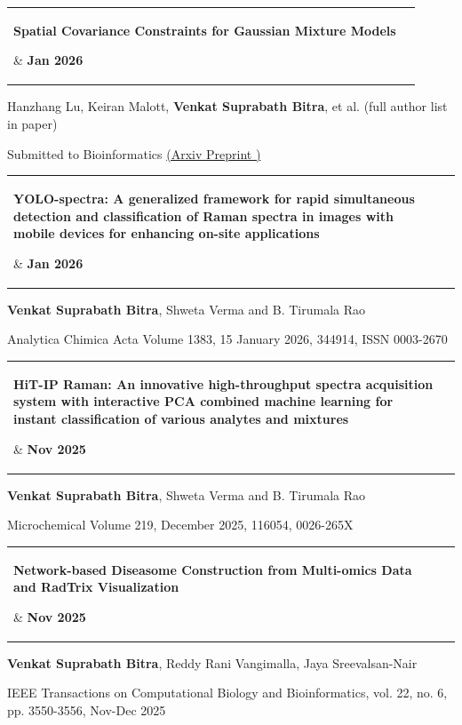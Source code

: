 \documentclass[letterpaper,11pt]{article}
\makeatletter
\newcommand{\resumeItem}[1]{
  \item\small{
    {#1 \vspace{-2pt}}
  }
}
\newcommand{\publicationHeading}[2]{
    \item
    \begin{tabular*}{1.001\textwidth}{@{\extracolsep{\fill}} l r}
      \parbox[t]{0.9\textwidth}{\small#1} & \textbf{\small #2}\\
    \end{tabular*}\vspace{-7pt}
}
\makeatother
\begin{document}
\vspace{-12pt}

\publicationHeading{\textbf{Spatial Covariance Constraints for Gaussian Mixture Models}}{Jan 2026}
\vspace{-12pt}
\resumeItem{Hanzhang Lu, Keiran Malott, \textbf{Venkat Suprabath Bitra}, et al. (full author list in paper)}
\vspace{-4pt}
\resumeItem{Submitted to Bioinformatics \href{https://www.arxiv.org/abs/2601.11768}{(Arxiv Preprint \raisebox{-0.2\height}\faExternalLink)}}

\vspace{-12pt}

\publicationHeading{\textbf{YOLO-spectra: A generalized framework for rapid simultaneous detection and classification of Raman spectra in images with mobile devices for enhancing on-site applications}}{Jan 2026}
\vspace{-4pt}
\resumeItem{\textbf{Venkat Suprabath Bitra}, Shweta Verma and B. Tirumala Rao}
\vspace{-4pt}  
\resumeItem{ Analytica Chimica Acta
Volume 1383, 15 January 2026, 344914, ISSN 0003-2670 \href{https://doi.org/10.1016/j.aca.2025.344914}{\raisebox{-0.2\height}\faExternalLink}}

\vspace{-12pt}

\publicationHeading{\textbf{HiT-IP Raman: An innovative high-throughput spectra acquisition system with interactive PCA combined machine learning for instant classification of various analytes and mixtures}}{Nov 2025}
\vspace{-4pt}
\resumeItem{\textbf{Venkat Suprabath Bitra}, Shweta Verma and B. Tirumala Rao}
\vspace{-4pt}  
\resumeItem{ Microchemical Volume 219, December 2025, 116054, 0026-265X \href{https://doi.org/10.1016/j.microc.2025.116054}{\raisebox{-0.2\height}\faExternalLink}}

\vspace{-12pt}

\publicationHeading{\textbf{Network-based Diseasome Construction from Multi-omics Data and RadTrix Visualization}}{Nov 2025}
\vspace{-12pt}
\resumeItem{\textbf{Venkat Suprabath Bitra}, Reddy Rani Vangimalla, Jaya Sreevalsan-Nair}
\vspace{-4pt}
\resumeItem{IEEE Transactions on Computational Biology and Bioinformatics, vol. 22, no. 6, pp. 3550-3556, Nov-Dec 2025 \href{https://doi.org/10.1109/TCBBIO.2025.3599771}{\raisebox{-0.2\height}\faExternalLink}}
\end{document}
